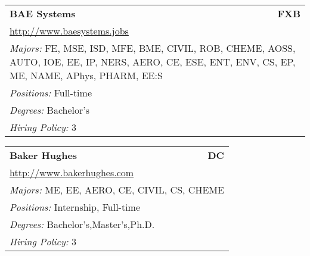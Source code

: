 \documentclass[twoside]{article}
\begin{document}
\begin{center}
\begin{multicols}{3}
\begin{FlushLeft}
\begin{minipage}{.9\columnwidth}
\end{minipage}
 
\begin{minipage}{.9\columnwidth}\begin{tabularx}{.95\columnwidth}{Xr}
                 {\Large\bf BAE Systems} & {\Large\bf FXB}\\
    \multicolumn{2}{p{.95\columnwidth}}{\url{http://www.baesystems.jobs}}\\
    \multicolumn{2}{p{.95\columnwidth}}{\emph{Majors:} FE, MSE, ISD, MFE, BME, CIVIL, ROB, CHEME, AOSS, AUTO, IOE, EE, IP, NERS, AERO, CE, ESE, ENT, ENV, CS, EP, ME, NAME, APhys, PHARM, EE:S}\\
    \multicolumn{2}{p{.95\columnwidth}}{\emph{Positions:} Full-time}\\
    \multicolumn{2}{p{.95\columnwidth}}{\emph{Degrees:} Bachelor's}\\
    \multicolumn{2}{p{.95\columnwidth}}{\emph{Hiring Policy:} 3}\\
    \end{tabularx}
    
\end{minipage}
 
\begin{minipage}{.9\columnwidth}\begin{tabularx}{.95\columnwidth}{Xr}
                 {\Large\bf Baker Hughes} & {\Large\bf DC}\\
    \multicolumn{2}{p{.95\columnwidth}}{\url{http://www.bakerhughes.com}}\\
    \multicolumn{2}{p{.95\columnwidth}}{\emph{Majors:} ME, EE, AERO, CE, CIVIL, CS, CHEME}\\
    \multicolumn{2}{p{.95\columnwidth}}{\emph{Positions:} Internship, Full-time}\\
    \multicolumn{2}{p{.95\columnwidth}}{\emph{Degrees:} Bachelor's,Master's,Ph.D.}\\
    \multicolumn{2}{p{.95\columnwidth}}{\emph{Hiring Policy:} 3}\\
    \end{tabularx}
    
\end{minipage}
 

\end{FlushLeft}
\end{multicols}
\end{center}
\end{document}
